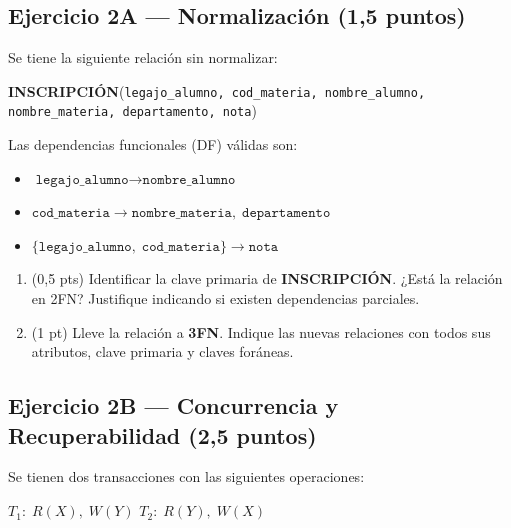 \documentclass[11pt,a4paper]{article}
\begin{document}
\subsection*{Ejercicio 2A — Normalización \hfill\normalfont(1{,}5 puntos)}

Se tiene la siguiente relación sin normalizar:

\begin{center}
\textbf{INSCRIPCIÓN}(\texttt{legajo\_alumno, cod\_materia, nombre\_alumno, nombre\_materia, departamento, nota})
\end{center}

Las dependencias funcionales (DF) válidas son:

\begin{itemize}
  \item $\texttt{legajo\_alumno} \rightarrow \texttt{nombre\_alumno}$
  \item $\texttt{cod\_materia} \rightarrow \texttt{nombre\_materia},\; \texttt{departamento}$
  \item $\{\texttt{legajo\_alumno},\; \texttt{cod\_materia}\} \rightarrow \texttt{nota}$
\end{itemize}

\begin{enumerate}
  \item (0{,}5 pts) Identificar la clave primaria de \textbf{INSCRIPCIÓN}. ¿Está la relación en 2FN? Justifique indicando si existen dependencias parciales.

  \vspace{3.5cm}

  \item (1 pt) Lleve la relación a \textbf{3FN}. Indique las nuevas relaciones con todos sus atributos, clave primaria y claves foráneas.

  \vspace{5cm}
\end{enumerate}

\subsection*{Ejercicio 2B — Concurrencia y Recuperabilidad \hfill\normalfont(2{,}5 puntos)}

Se tienen dos transacciones con las siguientes operaciones:

\begin{center}
$T_1:\; R(X),\; W(Y)$ \qquad\qquad $T_2:\; R(Y),\; W(X)$
\end{center}
\end{document}
